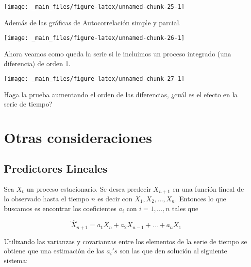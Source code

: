 \documentclass[
  a4paper,
  oneside,
  openany]{book}
\begin{document}
\begin{center}\texttt{[image: \_main\_files/figure-latex/unnamed-chunk-25-1]} \end{center}

Además de las gráficas de Autocorrelación simple y parcial.

\begin{center}\texttt{[image: \_main\_files/figure-latex/unnamed-chunk-26-1]} \end{center}

Ahora veamos como queda la serie si le incluimos un proceso integrado (una diferencia) de orden 1.

\begin{center}\texttt{[image: \_main\_files/figure-latex/unnamed-chunk-27-1]} \end{center}

Haga la prueba aumentando el orden de las diferencias, ¿cuál es el efecto en la serie de tiempo?

\hypertarget{part-otras-consideraciones}{%
\part{Otras consideraciones}\label{part-otras-consideraciones}}

\hypertarget{predictores-lineales}{%
\chapter{Predictores Lineales}\label{predictores-lineales}}

Sea \(X_t\) un proceso estacionario. Se desea predecir \(X_{n+1}\) en una función lineal de lo observado hasta el tiempo \(n\) es decir con \({X_1,X_2,...,X_n}\).
Entonces lo que buscamos es encontrar los coeficientes \(a_i\) con \(i=1,...,n\) tales que

\[
\hat{X}_{n+1}=a_1X_n+a_2X_{n-1}+...+a_nX_1
\]

Utilizando las varianzas y covarianzas entre los elementos de la serie de tiempo se obtiene que una estimación de las \(a_i's\) son las que den solución al siguiente sistema:
\end{document}
